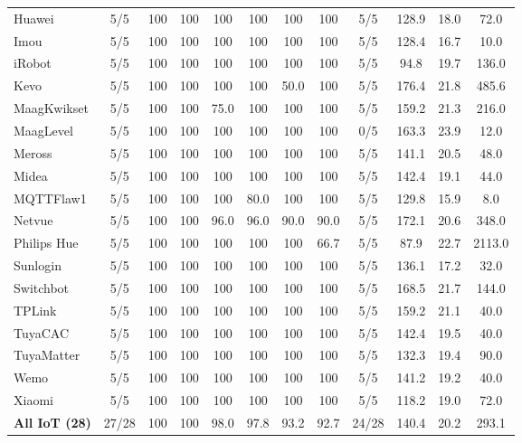 \begin{table}[t]
\begin{tabular*}{\linewidth}{@{\extracolsep{\fill}} l c cccc cc c ccc @{}}
  Huawei & 5/5 & 100 & 100 & 100 & 100 & 100 & 100 & 5/5 & 128.9 & 18.0 & 72.0 \\
  Imou & 5/5 & 100 & 100 & 100 & 100 & 100 & 100 & 5/5 & 128.4 & 16.7 & 10.0 \\
  iRobot & 5/5 & 100 & 100 & 100 & 100 & 100 & 100 & 5/5 & 94.8 & 19.7 & 136.0 \\
  Kevo & 5/5 & 100 & 100 & 100 & 100 & 50.0 & 100 & 5/5 & 176.4 & 21.8 & 485.6 \\
  MaagKwikset & 5/5 & 100 & 100 & 75.0 & 100 & 100 & 100 & 5/5 & 159.2 & 21.3 & 216.0 \\
  MaagLevel & 5/5 & 100 & 100 & 100 & 100 & 100 & 100 & 0/5 & 163.3 & 23.9 & 12.0 \\
  Meross & 5/5 & 100 & 100 & 100 & 100 & 100 & 100 & 5/5 & 141.1 & 20.5 & 48.0 \\
  Midea & 5/5 & 100 & 100 & 100 & 100 & 100 & 100 & 5/5 & 142.4 & 19.1 & 44.0 \\
  MQTTFlaw1 & 5/5 & 100 & 100 & 100 & 80.0 & 100 & 100 & 5/5 & 129.8 & 15.9 & 8.0 \\
  Netvue & 5/5 & 100 & 100 & 96.0 & 96.0 & 90.0 & 90.0 & 5/5 & 172.1 & 20.6 & 348.0 \\
  Philips Hue & 5/5 & 100 & 100 & 100 & 100 & 100 & 66.7 & 5/5 & 87.9 & 22.7 & 2113.0 \\
  Sunlogin & 5/5 & 100 & 100 & 100 & 100 & 100 & 100 & 5/5 & 136.1 & 17.2 & 32.0 \\
  Switchbot & 5/5 & 100 & 100 & 100 & 100 & 100 & 100 & 5/5 & 168.5 & 21.7 & 144.0 \\
  TPLink & 5/5 & 100 & 100 & 100 & 100 & 100 & 100 & 5/5 & 159.2 & 21.1 & 40.0 \\
  TuyaCAC & 5/5 & 100 & 100 & 100 & 100 & 100 & 100 & 5/5 & 142.4 & 19.5 & 40.0 \\
  TuyaMatter & 5/5 & 100 & 100 & 100 & 100 & 100 & 100 & 5/5 & 132.3 & 19.4 & 90.0 \\
  Wemo & 5/5 & 100 & 100 & 100 & 100 & 100 & 100 & 5/5 & 141.2 & 19.2 & 40.0 \\
  Xiaomi & 5/5 & 100 & 100 & 100 & 100 & 100 & 100 & 5/5 & 118.2 & 19.0 & 72.0 \\
  \hline
  \textbf{All IoT (28)} & 27/28 & 100 & 100 & 98.0 & 97.8 & 93.2 & 92.7 & 24/28 & 140.4 & 20.2 & 293.1 \\
  \hline\hline
  \end{tabular*}
\end{table}
